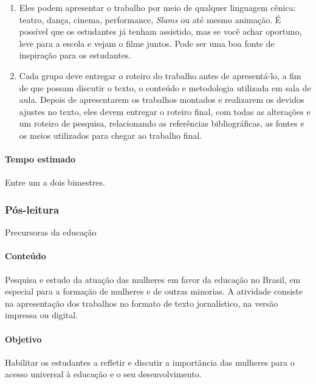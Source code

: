 \documentclass[12pt]{extarticle}
\begin{document}
\begin{enumerate}
\item
Eles podem apresentar o trabalho por meio de qualquer linguagem
cênica: teatro, dança, cinema, performance, \emph{Slams} ou até mesmo
animação. É possível que os estudantes já tenham assistido, mas se você
achar oportuno, leve para a escola e vejam o filme juntos. Pode ser uma
boa fonte de inspiração para os estudantes.

\item
Cada grupo deve entregar o roteiro do trabalho antes de apresentá-lo,
a fim de que possam discutir o texto, o conteúdo e metodologia utilizada
em sala de aula. Depois de apresentarem os trabalhos montados e
realizarem os devidos ajustes no texto, eles devem entregar o roteiro
final, com todas as alterações e um roteiro de pesquisa, relacionando as
referências bibliográficas, as fontes e os meios utilizados para chegar
ao trabalho final.
\end{enumerate}

\paragraph{Tempo estimado} Entre um a dois bimestres.



\subsubsection{Pós-leitura} Precursoras da educação



\paragraph{Conteúdo} Pesquisa e estudo da atuação das mulheres em favor da
educação no Brasil, em especial para a formação de mulheres e de outras
minorias. A atividade consiste na apresentação dos trabalhos no formato
de texto jornalístico, na versão impressa ou digital.

\paragraph{Objetivo} Habilitar os estudantes a refletir e discutir a
importância das mulheres para o acesso universal à educação e o seu
desenvolvimento.
\end{document}
